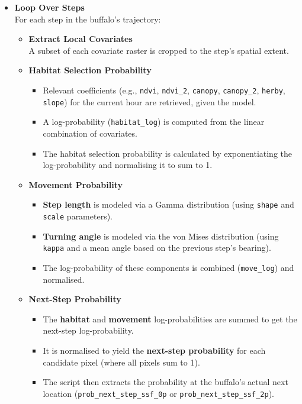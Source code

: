 \documentclass[
  letterpaper,
  DIV=11,
  numbers=noendperiod]{scrartcl}
\providecommand{\tightlist}{%
  \setlength{\itemsep}{0pt}\setlength{\parskip}{0pt}}
\begin{document}
\begin{itemize}
\item
  \textbf{Loop Over Steps}\\
  For each step in the buffalo's trajectory:

  \begin{itemize}
  \item
    \textbf{Extract Local Covariates}\\
    A subset of each covariate raster is cropped to the step's spatial
    extent.
  \item
    \textbf{Habitat Selection Probability}

    \begin{itemize}
    \tightlist
    \item
      Relevant coefficients (e.g., \texttt{ndvi}, \texttt{ndvi\_2},
      \texttt{canopy}, \texttt{canopy\_2}, \texttt{herby},
      \texttt{slope}) for the current hour are retrieved, given the
      model.
    \item
      A log-probability (\texttt{habitat\_log}) is computed from the
      linear combination of covariates.
    \item
      The habitat selection probability is calculated by exponentiating
      the log-probability and normalising it to sum to 1.
    \end{itemize}
  \item
    \textbf{Movement Probability}

    \begin{itemize}
    \tightlist
    \item
      \textbf{Step length} is modeled via a Gamma distribution (using
      \texttt{shape} and \texttt{scale} parameters).
    \item
      \textbf{Turning angle} is modeled via the von Mises distribution
      (using \texttt{kappa} and a mean angle based on the previous
      step's bearing).
    \item
      The log-probability of these components is combined
      (\texttt{move\_log}) and normalised.
    \end{itemize}
  \item
    \textbf{Next-Step Probability}

    \begin{itemize}
    \tightlist
    \item
      The \textbf{habitat} and \textbf{movement} log-probabilities are
      summed to get the next-step log-probability.
    \item
      It is normalised to yield the \textbf{next-step probability} for
      each candidate pixel (where all pixels sum to 1).
    \item
      The script then extracts the probability at the buffalo's actual
      next location (\texttt{prob\_next\_step\_ssf\_0p} or
      \texttt{prob\_next\_step\_ssf\_2p}).
    \end{itemize}
  \end{itemize}
\end{itemize}
\end{document}
